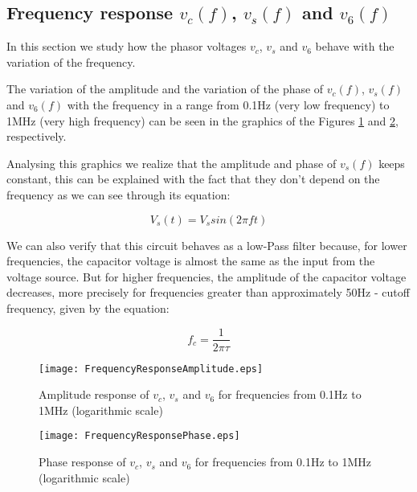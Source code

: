 \subsection{Frequency response $v_c(f)$, $v_s(f)$ and $v_6(f)$}

In this section we study how the phasor voltages $v_c$, $v_s$ and $v_6$ behave with the variation of the frequency. 

The variation of the amplitude and the variation of the phase of $v_c(f)$, $v_s(f)$ and $v_6(f)$ with the frequency in a range from 0.1Hz (very low frequency) to 1MHz (very high frequency) can be seen in the graphics of the Figures \ref{fig:FrequencyResponseAmplitude} and \ref{fig:FrequencyResponsePhase}, respectively. 

Analysing this graphics we realize that the amplitude and phase of $v_s(f)$ keeps constant, this can be explained with the fact that they don't depend on the frequency as we can see through its equation:

\begin{equation}
    V_{s}(t) = V_s sin(2 \pi f t)
\end{equation}

We can also verify that this circuit behaves as a low-Pass filter because, for lower frequencies, the capacitor voltage is almost the same as the input from the voltage source. But for higher frequencies, the amplitude of the capacitor voltage decreases, more precisely for frequencies greater than approximately 50Hz - cutoff frequency, given by the equation:

\begin{equation}
    f_{c}=\frac{1}{2 \pi \tau}
\end{equation}



\begin{figure}[H] \centering
  \texttt{[image: FrequencyResponseAmplitude.eps]}
  \caption{Amplitude response  of $v_c$, $v_s$ and $v_6$ for frequencies from 0.1Hz to 1MHz (logarithmic scale)}
  \label{fig:FrequencyResponseAmplitude}
\end{figure} 


\begin{figure}[H] \centering
  \texttt{[image: FrequencyResponsePhase.eps]}
  \caption{Phase response of $v_c$, $v_s$ and $v_6$ for frequencies from 0.1Hz to 1MHz (logarithmic scale)}
  \label{fig:FrequencyResponsePhase}
\end{figure} 











